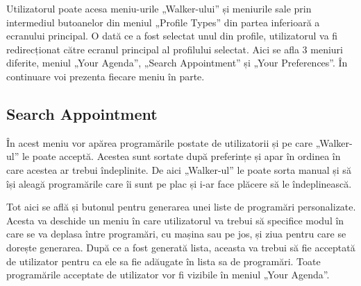 Utilizatorul poate acesa meniu-urile „Walker-ului” și meniurile sale prin intermediul butoanelor din meniul „Profile Types” din partea inferioară a ecranului principal. O dată ce a fost selectat unul din profile, utilizatorul va fi redirecționat către ecranul principal al profilului selectat. Aici se afla 3 meniuri diferite, meniul „Your Agenda”, „Search Appointment” și „Your Preferences”. În continuare voi prezenta fiecare meniu în parte.

\newpage

\subsection{Search Appointment}

În acest meniu vor apărea programările postate de utilizatorii și pe care „Walker-ul” le poate acceptă. Acestea sunt sortate după preferințe și apar în ordinea în care acestea ar trebui îndeplinite. De aici „Walker-ul” le poate sorta manual și să își aleagă programările care îi sunt pe plac și i-ar face plăcere să le îndeplinească. 

   
Tot aici se află și butonul pentru generarea unei liste de programări personalizate. Acesta va deschide un meniu în care utilizatorul va trebui să specifice modul în care se va deplasa între programări, cu mașina sau pe jos, și ziua pentru care se dorește generarea. După ce a fost generată lista, aceasta va trebui să fie acceptată de utilizator pentru ca ele sa fie adăugate în lista sa de programări. Toate programările acceptate de utilizator vor fi vizibile în meniul „Your Agenda”.


